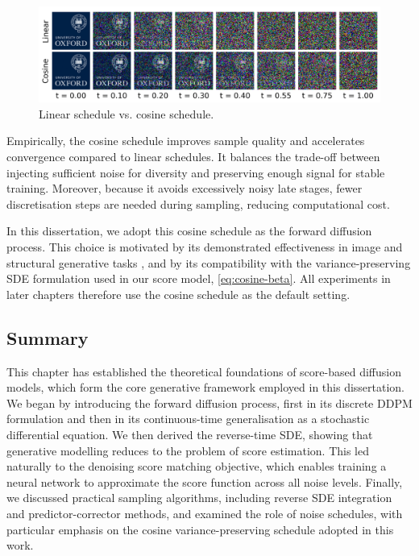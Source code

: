 \documentclass[a4paper,12pt]{article}
\begin{document}
\begin{figure}[htbp]
    \centering
    \includegraphics[width=\linewidth]{linear_vs_cosine.png}
    \caption{Linear schedule vs. cosine schedule.}
    \label{fig:schedule-linear-vs-cosine}
\end{figure}

Empirically, the cosine schedule improves sample quality and accelerates convergence compared to linear schedules. It balances the trade-off between injecting sufficient noise for diversity and preserving enough signal for stable training. Moreover, because it avoids excessively noisy late stages, fewer discretisation steps are needed during sampling, reducing computational cost.

In this dissertation, we adopt this cosine schedule as the forward diffusion process. This choice is motivated by its demonstrated effectiveness in image and structural generative tasks \citep{dhariwal2021DiffusionModelsBeat,saharia2022PhotorealisticTexttoImageDiffusion,watsonNovoDesignProtein2023}, and by its compatibility with the variance-preserving SDE formulation used in our score model, \cref{eq:cosine-beta}. All experiments in later chapters therefore use the cosine schedule as the default setting.

\subsection{Summary}
This chapter has established the theoretical foundations of score-based diffusion models, which form the core generative framework employed in this dissertation. We began by introducing the forward diffusion process, first in its discrete DDPM formulation and then in its continuous-time generalisation as a stochastic differential equation. We then derived the reverse-time SDE, showing that generative modelling reduces to the problem of score estimation. This led naturally to the denoising score matching objective, which enables training a neural network to approximate the score function across all noise levels. Finally, we discussed practical sampling algorithms, including reverse SDE integration and predictor-corrector methods, and examined the role of noise schedules, with particular emphasis on the cosine variance-preserving schedule adopted in this work.
\end{document}
